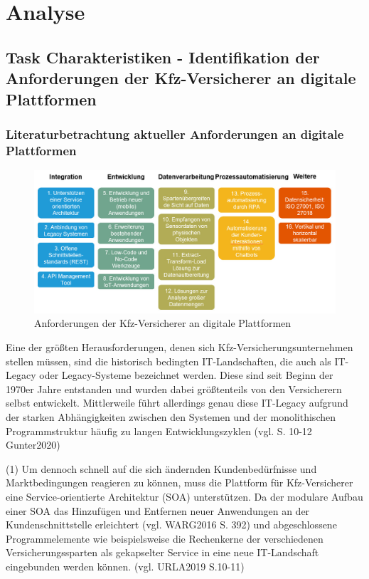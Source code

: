 \chapter{Analyse}
\section{Task Charakteristiken - Identifikation der Anforderungen der Kfz-Versicherer an digitale Plattformen}

\subsection{Literaturbetrachtung aktueller Anforderungen an digitale Plattformen}

\begin{figure}[h]
    \centering
    \includegraphics[width=1\textwidth]{img/PP_Anforderungen.jpg}
    \caption[Anforderungen der Kfz-Versicherer an digitale Plattformen]{Anforderungen der Kfz-Versicherer an digitale Plattformen\autocite{PPAnf}}
    \label{fig:PPAnf}
\end{figure}

Eine der größten Herausforderungen, denen sich Kfz-Versicherungsunternehmen stellen müssen, sind die historisch bedingten IT-Landschaften, die auch als IT-Legacy oder Legacy-Systeme bezeichnet werden. Diese sind seit Beginn der 1970er Jahre entstanden und wurden dabei größtenteils von den Versicherern selbst entwickelt. Mittlerweile führt allerdings genau diese IT-Legacy aufgrund der starken Abhängigkeiten zwischen den Systemen und der monolithischen Programmstruktur häufig zu langen Entwicklungszyklen (vgl. S. 10-12 Gunter2020) 

(1) Um dennoch schnell auf die sich ändernden Kundenbedürfnisse und Marktbedingungen reagieren zu können, muss die Plattform für Kfz-Versicherer eine Service-orientierte Architektur (SOA) unterstützen. Da der modulare Aufbau einer SOA das Hinzufügen und Entfernen neuer Anwendungen an der Kundenschnittstelle erleichtert (vgl. WARG2016 S. 392) und abgeschlossene Programmelemente wie beispielsweise die Rechenkerne der verschiedenen Versicherungssparten als gekapselter Service in eine neue IT-Landschaft eingebunden werden können. (vgl. URLA2019 S.10-11)

